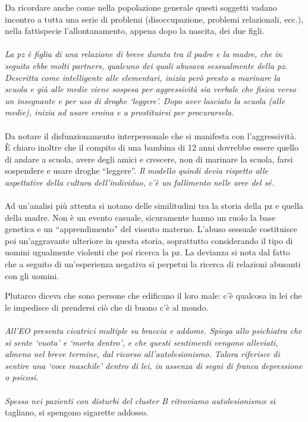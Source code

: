 Da ricordare anche come nella popolazione generale questi soggetti
vadano incontro a tutta una serie di problemi (disoccupazione, problemi
relazionali, ecc.), nella fattispecie l'allontanamento, appena dopo la
nascita, dei due figli.
\\\\
\emph{La pz è figlia di una relazione di breve durata tra il padre e la
madre, che in seguito ebbe molti partners, qualcuno dei quali abusava
sessualmente della pz. Descritta come intelligente alle elementari,
inizia però presto a marinare la scuola e già alle medie viene sospesa
per aggressività sia verbale che fisica verso un insegnante e per uso di
droghe `leggere'. Dopo aver lasciato la scuola (alle medie), inizia ad
usare eroina e a prostituirsi per procurarsela. }
\\\\
Da notare il disfunzionamento interpersonale che si manifesta con
l'aggressività. È chiaro inoltre che il compito di una bambina di 12
anni dovrebbe essere quello di andare a scuola, avere degli amici e
crescere, non di marinare la scuola, farsi sospendere e usare droghe
``leggere''. \emph{Il modello quindi devia rispetto alle aspettative
della cultura dell'individuo, c'è un fallimento nelle aree del sé.}
\\\\
Ad un'analisi più attenta si notano delle similitudini tra la storia
della pz e quella della madre. Non è un evento casuale, sicuramente
hanno un ruolo la base genetica e un ``apprendimento'' del vissuto
materno. L'abuso sessuale costituisce poi un'aggravante ulteriore in
questa storia, soprattutto considerando il tipo di uomini ugualmente
violenti che poi ricerca la pz. La devianza si nota dal fatto che a
seguito di un'esperienza negativa si perpetui la ricerca di relazioni
abusanti con gli uomini.

Plutarco diceva che sono persone che edificano il loro male: c'è
qualcosa in lei che le impedisce di prendersi ciò che di buono c'è al
mondo.
\\\\
\emph{All'EO presenta cicatrici multiple su braccia e addome. Spiega
allo psichiatra che si sente `vuota' e `morta dentro', e che questi
sentimenti vengono alleviati, almeno nel breve termine, dal ricorso
all'autolesionismo. Talora riferisce di sentire una `voce maschile'
dentro di lei, in assenza di segni di franca depressione o psicosi. }
\\\\
\emph{Spesso nei pazienti con disturbi del cluster B ritroviamo
autolesionismo}: si tagliano, si spengono sigarette addosso.

